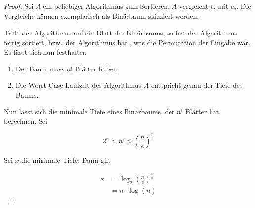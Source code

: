 \documentclass{scrartcl}%
\begin{document}
    \begin{proof}
        Sei $A$ ein beliebiger Algorithmus zum Sortieren. $A$ vergleicht $e_i$ mit $e_j$.
        Die Vergleiche können exemplarisch als Binärbaum skizziert werden.
        \begin{figure}[htb]
            \centering
        \end{figure}

        Trifft der Algorithmus auf ein Blatt des Binärbaums, so hat der Algorithmus fertig sortiert,
        bzw.\ der Algorithmus hat , was die Permutation der Eingabe war.
        Es lässt sich nun festhalten

        \begin{enumerate}
            \item Der Baum muss $n!$ Blätter haben.
            \item Die Worst-Case-Laufzeit des Algorithmus $A$ entspricht genau der Tiefe des Baums.
        \end{enumerate}

        Nun lässt sich die minimale Tiefe eines Binärbaums, der $n!$ Blätter hat, berechnen. Sei

        \begin{equation*}
            2^n \approx n! \approx \left({\frac{n}{e}}\right)^{\frac{n}{e}}
        \end{equation*}

        Sei $x$ die minimale Tiefe. Dann gilt

        \begin{align*}
            x &= \log_2\left(\frac{n}{e}\right)^{\frac{n}{e}}\\
            &= n \cdot \log(n)
        \end{align*}

    \end{proof}
\end{document}
